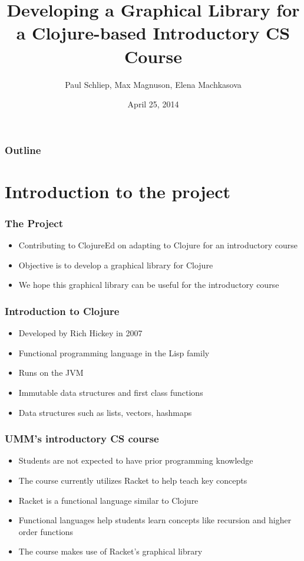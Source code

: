 \documentclass{beamer}
\begin{document}
\title{Developing a Graphical Library for a Clojure-based Introductory CS Course}
\author{Paul Schliep, Max Magnuson, Elena Machkasova}
\date{April 25, 2014}

\begin{frame}
  \titlepage
\end{frame}

\begin{frame}

  \frametitle{Outline}
\tableofcontents

\end{frame}

\section{Introduction to the project}

\begin{frame}
\frametitle{The Project}
\begin{itemize}
\item Contributing to ClojureEd on adapting to Clojure for an introductory course
\item Objective is to develop a graphical library for Clojure
\item We hope this graphical library can be useful for the introductory course
\end{itemize}
\end{frame}

\begin{frame}
\frametitle{Introduction to Clojure}
\begin{itemize}
\item Developed by Rich Hickey in 2007
\item Functional programming language in the Lisp family
\item Runs on the JVM
\item Immutable data structures and first class functions
\item Data structures such as lists, vectors, hashmaps
\end{itemize}
\end{frame}

\begin{frame}
\frametitle{UMM's introductory CS course}
\begin{itemize}
\item Students are not expected to have prior programming knowledge
\item The course currently utilizes Racket to help teach key concepts
\item Racket is a functional language similar to Clojure
\item Functional languages help students learn concepts like recursion and higher order functions
\item The course makes use of Racket's graphical library 
\end{itemize}
\end{frame}
\end{document}
